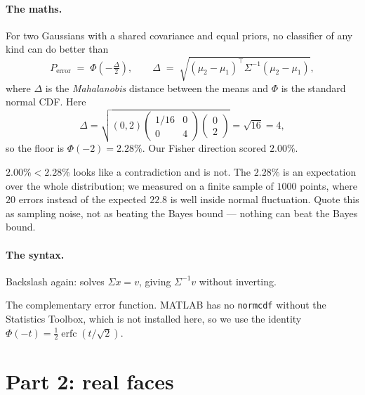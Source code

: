 \paragraph{The maths.} For two Gaussians with a shared covariance and equal
priors, no classifier of any kind can do better than
\[
  P_{\text{error}} \;=\; \Phi\!\left(-\tfrac{\Delta}{2}\right),
  \qquad
  \Delta \;=\; \sqrt{(\mu_2-\mu_1)^{\!\top}\Sigma^{-1}(\mu_2-\mu_1)} ,
\]
where $\Delta$ is the \emph{Mahalanobis} distance between the means and $\Phi$
is the standard normal CDF. Here
\[
  \Delta = \sqrt{(0,2)\begin{pmatrix}1/16&0\\0&4\end{pmatrix}\begin{pmatrix}0\\2\end{pmatrix}}
  = \sqrt{16} = 4,
\]
so the floor is $\Phi(-2) = 2.28\%$. Our Fisher direction scored $2.00\%$.

\begin{gotcha}
$2.00\% < 2.28\%$ looks like a contradiction and is not. The $2.28\%$ is an
expectation over the whole distribution; we measured on a finite sample of
$1000$ points, where $20$ errors instead of the expected $22.8$ is well inside
normal fluctuation. Quote this as sampling noise, not as beating the Bayes
bound --- nothing can beat the Bayes bound.
\end{gotcha}

\paragraph{The syntax.}
\begin{description}[leftmargin=*,style=nextline,nosep]
\item[\texttt{Sigma \textbackslash\ v}] Backslash again: solves
  $\Sigma x = v$, giving $\Sigma^{-1}v$ without inverting.
\item[\texttt{erfc(z)}] The complementary error function. MATLAB has no
  \texttt{normcdf} without the Statistics Toolbox, which is not installed here,
  so we use the identity $\Phi(-t) = \tfrac12\operatorname{erfc}(t/\sqrt{2})$.
\end{description}

\section{Part 2: real faces}

